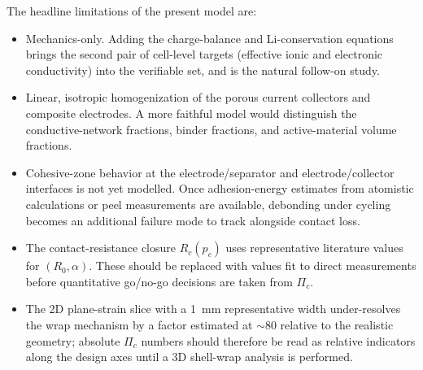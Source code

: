 \documentclass[11pt,letterpaper]{article}
\begin{document}
The headline limitations of the present model are:

\begin{itemize}
\item Mechanics-only.  Adding the charge-balance and Li-conservation
equations brings the second pair of cell-level targets (effective
ionic and electronic conductivity) into the verifiable set, and is
the natural follow-on study.
\item Linear, isotropic homogenization of the porous current
collectors and composite electrodes.  A more faithful model would
distinguish the conductive-network fractions, binder fractions, and
active-material volume fractions.
\item Cohesive-zone behavior at the electrode/separator and
electrode/collector interfaces is not yet modelled.  Once
adhesion-energy estimates from atomistic calculations or peel
measurements are available, debonding under cycling becomes an
additional failure mode to track alongside contact loss.
\item The contact-resistance closure $R_c(p_c)$ uses representative
literature values for $(R_0, \alpha)$.  These should be replaced with
values fit to direct measurements before quantitative go/no-go
decisions are taken from $\Pi_c$.
\item The 2D plane-strain slice with a 1~mm representative width
under-resolves the wrap mechanism by a factor estimated at $\sim$80
relative to the realistic geometry; absolute $\Pi_c$ numbers should
therefore be read as relative indicators along the design axes until
a 3D shell-wrap analysis is performed.
\end{itemize}
\end{document}
